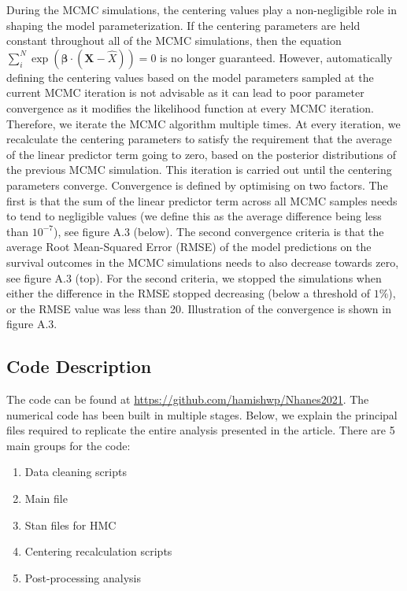 \documentclass[
]{article}
\providecommand{\tightlist}{%
  \setlength{\itemsep}{0pt}\setlength{\parskip}{0pt}}
\begin{document}
During the MCMC simulations, the centering values play a non-negligible
role in shaping the model parameterization. If the centering parameters
are held constant throughout all of the MCMC simulations, then the
equation
\(\sum_i^N \exp{(\boldsymbol{\beta}\cdot(\boldsymbol{X}-\hat{X}))}=0\)
is no longer guaranteed. However, automatically defining the centering
values based on the model parameters sampled at the current MCMC
iteration is not advisable as it can lead to poor parameter convergence
as it modifies the likelihood function at every MCMC iteration.
Therefore, we iterate the MCMC algorithm multiple times. At every
iteration, we recalculate the centering parameters to satisfy the
requirement that the average of the linear predictor term going to zero,
based on the posterior distributions of the previous MCMC simulation.
This iteration is carried out until the centering parameters converge.
Convergence is defined by optimising on two factors. The first is that
the sum of the linear predictor term across all MCMC samples needs to
tend to negligible values (we define this as the average difference
being less than \(10^{-7}\)), see figure A.3 (below). The second
convergence criteria is that the average Root Mean-Squared Error (RMSE)
of the model predictions on the survival outcomes in the MCMC
simulations needs to also decrease towards zero, see figure A.3 (top).
For the second criteria, we stopped the simulations when either the
difference in the RMSE stopped decreasing (below a threshold of
\(1\%\)), or the RMSE value was less than 20. Illustration of the
convergence is shown in figure A.3.

\hypertarget{code-description}{%
\subsection{Code Description}\label{code-description}}

The code can be found at \url{https://github.com/hamishwp/Nhanes2021}.
The numerical code has been built in multiple stages. Below, we explain
the principal files required to replicate the entire analysis presented
in the article. There are 5 main groups for the code:

\begin{enumerate}
\def\labelenumi{\arabic{enumi}.}
\tightlist
\item
  Data cleaning scripts
\item
  Main file
\item
  Stan files for HMC
\item
  Centering recalculation scripts
\item
  Post-processing analysis
\end{enumerate}
\end{document}
